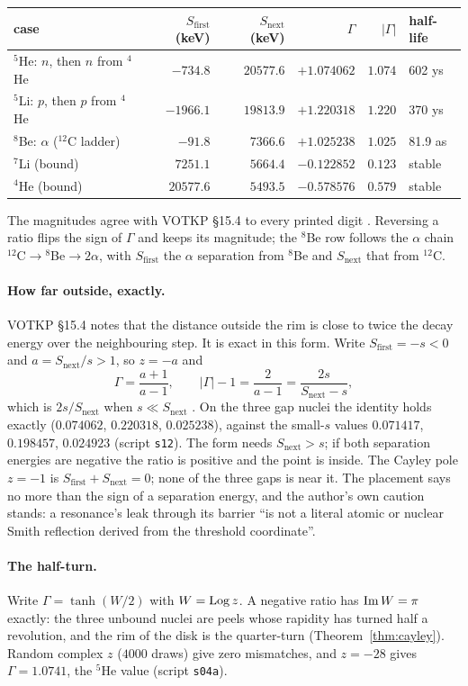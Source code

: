 \begin{center}
\begin{tabular}{lrrrrl}\toprule
case & $S_{\mathrm{first}}$ (keV) & $S_{\mathrm{next}}$ (keV) & $\Gamma$ & $|\Gamma|$ & half-life\\\midrule
${}^5$He: $n$, then $n$ from ${}^4$He & $-734.8$ & $20577.6$ & $+1.074062$ & $1.074$ & 602 ys\\
${}^5$Li: $p$, then $p$ from ${}^4$He & $-1966.1$ & $19813.9$ & $+1.220318$ & $1.220$ & 370 ys\\
${}^8$Be: $\alpha$ ($^{12}$C ladder) & $-91.8$ & $7366.6$ & $+1.025238$ & $1.025$ & 81.9 as\\
${}^7$Li (bound) & $7251.1$ & $5664.4$ & $-0.122852$ & $0.123$ & stable\\
${}^4$He (bound) & $20577.6$ & $5493.5$ & $-0.578576$ & $0.579$ & stable\\\bottomrule
\end{tabular}
\end{center}
\noindent The magnitudes agree with VOTKP §15.4 to every printed digit . Reversing a ratio flips the sign of $\Gamma$ and keeps its magnitude; the ${}^8$Be row follows the $\alpha$ chain ${}^{12}$C$\to{}^8$Be$\to2\alpha$, with $S_{\mathrm{first}}$ the $\alpha$ separation from ${}^8$Be and $S_{\mathrm{next}}$ that from ${}^{12}$C.

\paragraph{How far outside, exactly.} VOTKP §15.4 notes that the distance outside the rim is close to twice the decay energy over the neighbouring step. It is exact in this form. Write $S_{\mathrm{first}}=-s<0$ and $a=S_{\mathrm{next}}/s>1$, so $z=-a$ and
\[
\Gamma=\frac{a+1}{a-1},\qquad |\Gamma|-1=\frac{2}{a-1}=\frac{2s}{S_{\mathrm{next}}-s},
\]
which is $2s/S_{\mathrm{next}}$ when $s\ll S_{\mathrm{next}}$ . On the three gap nuclei the identity holds exactly ($0.074062$, $0.220318$, $0.025238$), against the small-$s$ values $0.071417$, $0.198457$, $0.024923$ (script \texttt{s12}). The form needs $S_{\mathrm{next}}>s$; if both separation energies are negative the ratio is positive and the point is inside. The Cayley pole $z=-1$ is $S_{\mathrm{first}}+S_{\mathrm{next}}=0$; none of the three gaps is near it. The placement says no more than the sign of a separation energy, and the author's own caution stands: a resonance's leak through its barrier ``is not a literal atomic or nuclear Smith reflection derived from the threshold coordinate''.

\paragraph{The half-turn.} Write $\Gamma=\tanh(W/2)$ with $W=\operatorname{Log} z$. A negative ratio has $\operatorname{Im} W=\pi$ exactly: the three unbound nuclei are peels whose rapidity has turned half a revolution, and the rim of the disk is the quarter-turn (Theorem~\ref{thm:cayley}). Random complex $z$ ($4000$ draws) give zero mismatches, and $z=-28$ gives $\Gamma=1.0741$, the ${}^5$He value  (script \texttt{s04a}).
